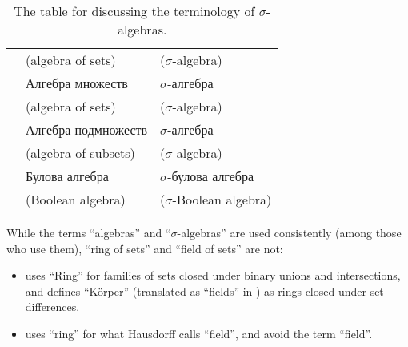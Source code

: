 \begin{remark}
\begin{table}[!ht]
\begin{tabular}{l l l}
                                                                 & \footnotesize (algebra of sets)                       & \footnotesize (\( \sigma \)-algebra)             \\
      \cite[def. 1.2.1; def. 1.2.2]{Богачёв2003ТеорияМерыТом1}   & Алгебра множеств                                      & \( \sigma \)-алгебра                             \\
                                                                 & \footnotesize (algebra of sets)                       & \footnotesize (\( \sigma \)-algebra)             \\
      \cite[def. II.1.1; def. II.1.4]{Ширяев2007ВероятностиТом1} & Алгебра подмножеств                                   & \( \sigma \)-алгебра                             \\
                                                                 & \footnotesize (algebra of subsets)                    & \footnotesize (\( \sigma \)-algebra)             \\
      \cite[def. 1.1; def.1.2]{ДимитровЯнев2007Статистика}       & Булова алгебра                                        & \( \sigma \)-булова алгебра                      \\
                                                                 & \footnotesize (Boolean algebra)                       & \footnotesize (\( \sigma \)-Boolean algebra)     \\
      \bottomrule
    \end{tabular}
    \caption{The table for  discussing the terminology of \( \sigma \)-algebras.}\label{tab:rem:sigma_algebra_terminology}
  \end{table}

  While the terms \enquote{algebras} and \enquote{\( \sigma \)-algebras} are used consistently (among those who use them), \enquote{ring of sets} and \enquote{field of sets} are not:
  \begin{itemize}
    \item {} uses \enquote{Ring} for families of sets closed under binary unions and intersections, and defines \enquote{K\"{o}rper} (translated as \enquote{fields} in \cite[90]{Hausdorff1962Sets}) as rings closed under set differences.

    \item {} uses \enquote{ring} for what Hausdorff calls \enquote{field}, and avoid the term \enquote{field}.


\end{itemize}
\end{remark}

